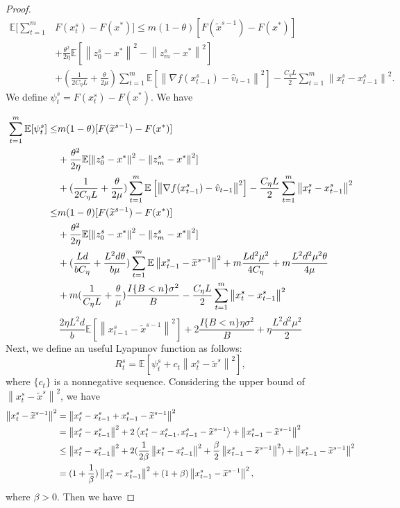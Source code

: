 \documentclass{article}
\newcommand*{\E}{\mathbb{E}}
\newcommand{\norm}[1]{\left\lVert#1\right\rVert}
\newcommand{\Iprod}[2]{\left\langle #1,#2\right\rangle}
\theoremstyle{definition}
\theoremstyle{remark}
\begin{document}
{\begin{proof}
\begin{equation}
\begin{split}
\E[\sum_{t=1}^{m}&F(x_{t}^s)-F(x^*)] \leq  m(1-\theta)[F(\widetilde{x}^{s-1})-F(x^*)] \\
&+ {\frac{ \theta^2}{2\eta}}\E[\norm{z_{0}^s-x^*}^2-\norm{z_{m}^s-x^*}^2]\\
&+(\frac{1}{2C_{\eta} L}+\frac{\theta}{2\mu})\sum_{t=1}^{m}\E\left[\norm{\nabla f(x_{t-1}^s)-\hat{v}_{t-1}}^2\right]-\frac{C_{\eta} L}{2}\sum_{t=1}^{m}\norm{x_{t}^s-x_{t-1}^s}^2. 
\end{split}
\end{equation}
We define $\psi_t^s = F({x}^s_t)-F(x^*)$. We have

\begin{align}
\sum_{t=1}^{m}\E[\psi_{t}^s] \leq &m(1-\theta)[F(\widetilde{x}^{s-1})-F(x^*)]\notag\\
&+ {\frac{ \theta^2}{2\eta}}\E[\norm{z_{0}^s-x^*}^2-\norm{z_{m}^s-x^*}^2]\notag\\
&+(\frac{1}{2C_{\eta} L}+\frac{\theta}{2\mu})\sum_{t=1}^{m}\E\left[\norm{\nabla f(x_{t-1}^s)-\hat{v}_{t-1}}^2\right]-\frac{C_{\eta} L}{2}\sum_{t=1}^{m}\norm{x_{t}^s-x_{t-1}^s}^2\notag\\
\leq &m(1-\theta)[F(\widetilde{x}^{s-1})-F(x^*)] \notag\\
&+ {\frac{ \theta^2}{2\eta}}\E[\norm{z_{0}^s-x^*}^2-\norm{z_{m}^s-x^*}^2]\notag\\
&+(\frac{Ld}{bC_{\eta}}+\frac{L^2d\theta}{b\mu})\sum_{t=1}^{m} \E\norm{x_{t-1}^s-\widetilde{x}^{s-1}}^2+m\frac{Ld^2\mu^2}{4C_{\eta}}+m\frac{ L^2d^2\mu^2\theta}{4\mu}\notag\\
&+ m(\frac{1}{C_{\eta} L}+\frac{\theta}{\mu})\frac{I\{B < n\} \sigma ^2}{B}-\frac{C_{\eta} L}{2}\sum_{t=1}^{m}\norm{x_{t}^s-x_{t-1}^s}^2
\end{align}
{\color{red}
\begin{equation}
\frac{2\eta L^2 d}{b}\E\left[\norm{x_{t-1}^s-\widetilde{x}^{s-1}}^2\right]+ 2\frac{I\{B < n\}\eta \sigma ^2}{B}+\eta \frac{L^2 d^2 \mu^2}{2}
\end{equation}}
Next, we define an useful Lyapunov function as follows:
\begin{equation}
R_t^s = \E\left[\psi_{t}^s+ c_t\norm{x_t^s-\tilde{x}^s}^2\right],
\end{equation}
where $\{c_t\}$ is a nonnegative sequence. Considering the upper bound of $\norm{x_{t}^s-\widetilde{x}^s}^2$, we have
\begin{align}
\norm{x_{t}^s-\widetilde{x}^{s-1}}^2 &= \norm{x_{t}^s-x_{t-1}^s+x_{t-1}^s-\widetilde{x}^{s-1}}^2\notag\\
&=\norm{x_{t}^s-x_{t-1}^s}^2+2\Iprod{x_{t}^s-x_{t-1}^s}{x_{t-1}^s-\widetilde{x}^{s-1}}+\norm{x_{t-1}^s-\widetilde{x}^{s-1}}^2\notag\\
&\leq \norm{x_{t}^s-x_{t-1}^s}^2 + 2(\frac{1}{2\beta}\norm{x_{t}^s-x_{t-1}^s}^2+\frac{\beta}{2}\norm{x_{t-1}^s-\widetilde{x}^{s-1}}^2)+\norm{x_{t-1}^s-\widetilde{x}^{s-1}}^2\notag\\
&= (1+\frac{1}{\beta})\norm{x_{t}^s-x_{t-1}^s}^2+(1+\beta)\norm{x_{t-1}^s-\widetilde{x}^{s-1}}^2,
\end{align}
where $\beta > 0$. Then we have 


\end{proof}}
\end{document}

